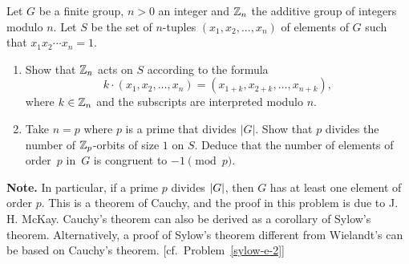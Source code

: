 \begin{probl}\label{cauchy}
    Let $G$ be a finite group, $n > 0$ an integer and\/ $\mathbb{Z}_n$ the additive group of integers modulo $n$. Let $S$ be the set of $n$-tuples $(x_1, x_2, ..., x_n)$ of elements of\/ $G$ such that $x_1x_2\cdots x_n = 1$.
    \begin{enumerate}[\rm a)]
        \item Show that $\mathbb{Z}_n$ acts on $S$ according to the formula
        $$
            k\cdot(x_1, x_2, \dots, x_n) = (x_{1+k}, x_{2+k}, \dots, x_{n+k}),
        $$
        where $k\in\mathbb{Z}_n$ and the subscripts are interpreted modulo $n$.

        \item Take $n = p$ where $p$ is a prime that divides $|G|$. Show that $p$ divides the number of\/ $\mathbb{Z}_p$-orbits of size $1$ on\/ $S$. Deduce that the number of elements of order\/~$p$ in\/~$G$ is congruent to $-1 \pmod{p}$.
    \end{enumerate}
    
    \textrm{\rm{\bf Note.} In particular, if a prime $p$ divides $\left\vert{G}\right\vert$, then $G$ has at least one element of order $p$. This is a theorem of Cauchy, and the proof in this problem is due to J. H. McKay. Cauchy's theorem can also be derived as a corollary of Sylow's theorem. Alternatively, a proof of Sylow's theorem different from Wielandt's can be based on Cauchy's theorem. [cf.~Problem~\ref{sylow-e-2}]}
\end{probl}

